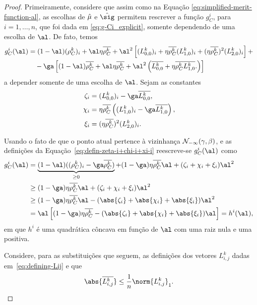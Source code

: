 \begin{proof}
 Primeiramente, considere que  assim como na Equação \eqref{eq:simplified-merit-function-al}, as escolhas de $\hat{\mu}$ e $\nextsig$ permitem rescrever a função $g_C^i $, para $i=1,\ldots,n$, que foi dada em \eqref{eq:g-Ci_explicit}, somente dependendo de uma escolha de $\al$. De fato, temos
\[
\begin{aligned}
{g}_C^i (\al)				& = (1-\al)(\rho_C^k )_i+ \al\eta\rhoCkb + \al^2\left[(L_{0,0}^{k})_i + \eta\rhoCkb  ({L_{1,0}^{k}})_i 
				+ (\eta\rhoCkb )^2(L_{2,0}^{k})_i \right]  + \\
				& \quad -\ga\left[  (1-\al)\rhoCkb  + \al\eta\rhoCkb  + \al^2\left(\dbvec{L_{0,0}^{k}} + \eta\rhoCkb  \dbvec{L_{1,0}^{k}}.
\right)  \right]
\end{aligned}
\]
a depender somente de uma escolha de $\al$.
Sejam as constantes
\begin{equation}
\label{eq:defin-zeta-i+chi-i+xi-i}
	\begin{aligned}
\zeta_i & = (L_{0,0}^{k})_i - \ga \dbvec{L_{0,0}^{k}}, \\
\chi_i  & = \eta\rhoCkb  \left( ({L_{1,0}^{k}})_i - \ga\dbvec{L_{1,0}^{k}} \right),   \\
\xi_i	& =  (\eta\rhoCkb )^2(L_{2,0}^{k})_i . \\ 	
\end{aligned}
\end{equation}



Usando o fato de que o ponto atual pertence à vizinhança $\mathcal{N}_{-\infty}(\gamma,\beta)$, e as definições da Equação~\eqref{eq:defin-zeta-i+chi-i+xi-i} reescreve-se  $g_C^i(\al) $ como
\[
\begin{aligned}
	g_C^i (\al) & = \underbrace{(1-\al)((\rho_C^k )_i - \ga\rhoCkb )}_{\geq 0}  + (1-\ga)\eta\rhoCkb  \al+  (\zeta_i + 				\chi_i + \xi_i)\al^2  \\
				& \geq (1-\ga)\eta\rhoCkb  \al +  (\zeta_i + 				\chi_i + \xi_i)\al^2 \\ 
				& \geq (1-\ga)\eta\rhoCkb  \al -  (\abs{\zeta_i} + \abs{\chi_i} + \abs{\xi_i})\al^2 \\
				& = \al \left[	(1-\ga)\eta\rhoCkb   -  (\abs{\zeta_i} + \abs{\chi_i} + \abs{\xi_i})\al	\right] = h^i(\al),
\end{aligned}
\]
em que $h^i$ é uma quadrática côncava em função de $\al$ com uma raiz nula e uma positiva. 

Considere, para as substituições que seguem, as definições dos vetores $L_{i,j}^{k}$ dadas em~\eqref{eq:defining-Lij} e que \[\abs{\dbvec{L_{i,j}^{k}}} \leq \frac{1}{n}\norm{L_{i,j}^{k}}_{1}.\] 


\end{proof}
